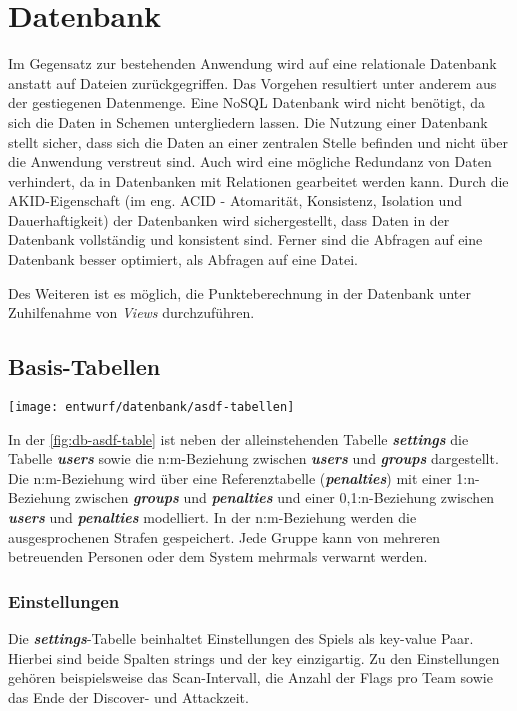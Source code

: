 \section{Datenbank}
Im Gegensatz zur bestehenden Anwendung wird auf eine relationale Datenbank anstatt auf Dateien zurückgegriffen. Das Vorgehen resultiert unter anderem aus der gestiegenen Datenmenge. Eine NoSQL Datenbank wird nicht benötigt, da sich die Daten in Schemen untergliedern lassen. Die Nutzung einer Datenbank stellt sicher, dass sich die Daten an einer zentralen Stelle befinden und nicht über die Anwendung verstreut sind. Auch wird eine mögliche Redundanz von Daten verhindert, da in Datenbanken mit Relationen gearbeitet werden kann. Durch die AKID-Eigenschaft (im eng. ACID - Atomarität, Konsistenz, Isolation und Dauerhaftigkeit) der Datenbanken wird sichergestellt, dass Daten in der Datenbank vollständig und konsistent sind. Ferner sind die Abfragen auf eine Datenbank besser optimiert, als Abfragen auf eine Datei. \cite{drillingWasIstDatenbank2017}

Des Weiteren ist es möglich, die Punkteberechnung in der Datenbank unter Zuhilfenahme von \textit{Views} durchzuführen.

\subsection{Basis-Tabellen}
\begin{center}
	\texttt{[image: entwurf/datenbank/asdf-tabellen]}
	\label{fig:db-asdf-table}
\end{center}

In der \autoref{fig:db-asdf-table} ist neben der alleinstehenden Tabelle \textbf{\textit{settings}} die Tabelle \textbf{\textit{users}} sowie die n:m-Beziehung  zwischen \textbf{\textit{users}} und \textbf{\textit{groups}} dargestellt. Die  n:m-Beziehung wird über eine Referenztabelle (\textbf{\textit{penalties}}) mit einer 1:n-Beziehung zwischen \textbf{\textit{groups}} und \textbf{\textit{penalties}} und einer 0,1:n-Beziehung zwischen \textbf{\textit{users}} und \textbf{\textit{penalties}} modelliert. In der n:m-Beziehung werden die ausgesprochenen Strafen gespeichert. Jede Gruppe kann von mehreren betreuenden Personen oder dem System mehrmals verwarnt werden.

\subsubsection{Einstellungen}
Die \textbf{\textit{settings}}-Tabelle beinhaltet Einstellungen des Spiels als key-value Paar. Hierbei sind beide Spalten strings und der key einzigartig. Zu den Einstellungen gehören beispielsweise das Scan-Intervall, die Anzahl der Flags pro Team sowie das Ende der Discover- und Attackzeit.

